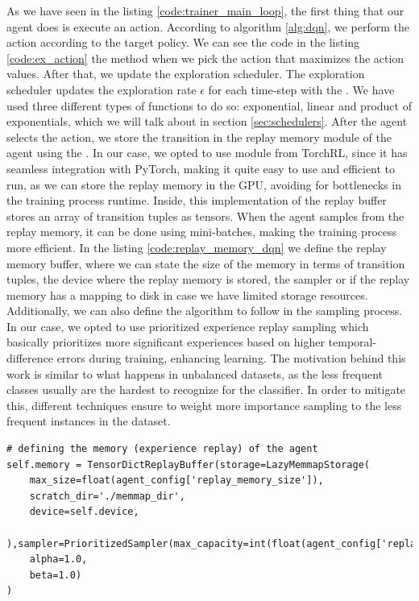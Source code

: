 As we have seen in the listing \ref{code:trainer_main_loop}, the first thing that our agent does is execute an action. According to algorithm \ref{alg:dqn}, we perform the action according to the target policy. We can see the code in the listing \ref{code:ex_action} the  method when we pick the action that maximizes the action values. After that, we update the exploration scheduler. The exploration scheduler updates the exploration rate $\epsilon$ for each time-step with the . We have used three different types of functions to do so: exponential, linear and product of exponentials, which we will talk about in section \ref{sec:schedulers}. After the agent selects the action, we store the transition in the replay memory module of the agent using the . In our case, we opted to use  module from TorchRL, since it has seamless integration with PyTorch, making it quite easy to use and efficient to run, as we can store the replay memory in the GPU, avoiding for bottlenecks in the training process runtime. Inside, this implementation of the replay buffer stores an array of transition tuples as tensors. When the agent samples from the replay memory, it can be done using mini-batches, making the training process more efficient. In the listing \ref{code:replay_memory_dqn} we define the replay memory buffer, where we can state the size of the memory in terms of transition tuples, the device where the replay memory is stored, the sampler or if the replay memory has a mapping to disk in case we have limited storage resources. Additionally, we can also define the algorithm to follow in the sampling process. In our case, we opted to use prioritized experience replay sampling \cite{schaul2016prioritized} which basically prioritizes more significant experiences based on higher temporal-difference errors during training, enhancing learning. The motivation behind this work is similar to what happens in unbalanced datasets, as the less frequent classes usually are the hardest to recognize for the classifier. In order to mitigate this, different techniques ensure to weight more importance sampling to the less frequent instances in the dataset. 

\begin{lstlisting}[caption={Code snippet for the replay memory of the DQN agent}, label={code:replay_memory_dqn}]
# defining the memory (experience replay) of the agent
self.memory = TensorDictReplayBuffer(storage=LazyMemmapStorage(
	max_size=float(agent_config['replay_memory_size']),
	scratch_dir='./memmap_dir',
	device=self.device,
	),sampler=PrioritizedSampler(max_capacity=int(float(agent_config['replay_memory_size'])), 
	alpha=1.0, 
	beta=1.0)
)
\end{lstlisting}

